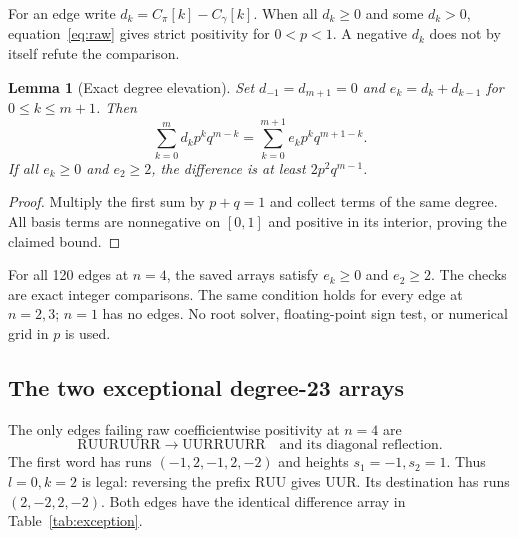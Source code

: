 \documentclass[11pt,a4paper]{article}
\newtheorem{lemma}[theorem]{Lemma}
\newcommand{\R}{\mathrm R}
\newcommand{\U}{\mathrm U}
\begin{document}
For an edge write $d_k=C_\pi[k]-C_\gamma[k]$. When all $d_k\geq0$ and
some $d_k>0$, equation~\eqref{eq:raw} gives strict positivity for
$0<p<1$. A negative $d_k$ does not by itself refute the comparison.

\begin{lemma}[Exact degree elevation]\label{lem:elevation}
Set $d_{-1}=d_{m+1}=0$ and $e_k=d_k+d_{k-1}$ for $0\leq k\leq m+1$.
Then
\[
 \sum_{k=0}^m d_kp^kq^{m-k}
 =\sum_{k=0}^{m+1}e_kp^kq^{m+1-k}.
\]
If all $e_k\geq0$ and $e_2\geq2$, the difference is at least
$2p^2q^{m-1}$.
\end{lemma}
\begin{proof}
Multiply the first sum by $p+q=1$ and collect terms of the same
degree. All basis terms are nonnegative on $[0,1]$ and positive in
its interior, proving the claimed bound.
\end{proof}

For all 120 edges at $n=4$, the saved arrays satisfy $e_k\geq0$ and
$e_2\geq2$. The checks are exact integer comparisons. The same condition
holds for every edge at $n=2,3$; $n=1$ has no edges.
No root solver, floating-point sign test, or numerical grid in $p$
is used.

\subsection{The two exceptional degree-23 arrays}
The only edges failing raw coefficientwise positivity at $n=4$ are
\[
 \R\U\U\R\U\U\R\R\longrightarrow\U\U\R\R\U\U\R\R
 \quad\text{and its diagonal reflection.}
\]
The first word has runs $(-1,2,-1,2,-2)$ and heights
$s_1=-1,s_2=1$. Thus $l=0,k=2$ is legal: reversing the prefix
$\R\U\U$ gives $\U\U\R$. Its destination has runs $(2,-2,2,-2)$.
Both edges have the identical difference array in Table~\ref{tab:exception}.
\end{document}
